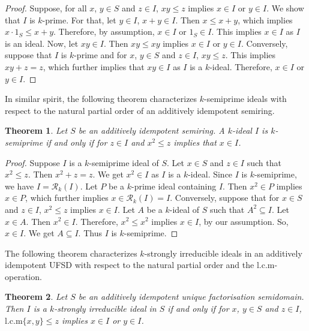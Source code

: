 \documentclass[11pt,english]{amsart}
\newtheorem{theorem}{Theorem}[section]
\theoremstyle{definition}
\numberwithin{equation}{section}
\begin{document}
\begin{proof}
    Suppose, for all $x$, $y \in S$ and $z \in I$, $xy \leqslant z$ implies $x \in I$ or $y \in I$. We show that $I$ is $k$-prime. For that, let $y \in I$, $x+y \in I$. Then $x \leqslant x+y$, which implies $x\cdot1_S \leqslant x+y$. Therefore,  by assumption, $x\in I $ or $1_S \in I $. This implies $x \in I$ as $I$ is an ideal. Now, let $xy \in I$. Then $xy \leqslant xy$ implies $x \in I$ or $y \in I$. Conversely, suppose that $I$ is $k$-prime and for $x$, $y \in S$ and $z \in I$, $xy \leqslant z$. This implies $xy + z = z$, which further implies that $xy \in I$ as $I$ is a $k$-ideal. Therefore, $x \in I$ or $y \in I$.
\end{proof}

In similar spirit, the following theorem characterizes $k$-semiprime ideals with respect to the natural partial order of an additively idempotent semiring. 

\begin{theorem}\label{k-semiprime via natural partial order}
    Let $S$ be an additively idempotent semiring. A $k$-ideal $I$ is $k$-semiprime if and only if for $z \in I$ and $x^2 \leqslant z$ implies that $ x \in I$.
\end{theorem}

 \begin{proof}
     Suppose $I$ is a $k$-semiprime ideal of $S$. Let $x \in S$ and $z \in I$ such that $x^2 \leqslant z$. Then $x^2 + z = z$. We get $x^2 \in I$ as $I$ is a $k$-ideal. Since $I$ is $k$-semiprime, we have $I=\mathcal{R}_k(I)$. Let $P$ be a $k$-prime ideal containing $I$. Then $x^2 \in P$ implies $x \in P$, which further implies $x \in \mathcal{R}_k(I) = I$. Conversely, suppose that for $x \in S$ and $z \in I$, $x^2 \leqslant z$ implies $x \in I$. Let $A$ be a $k$-ideal of $S$ such that $A^2 \subseteq I$. Let $x \in A$. Then $x^2 \in I$. Therefore, $x^2 \leqslant x^2$ implies $x \in I$, by our assumption. So, $x \in I$. We get $A \subseteq I$. Thus $I$ is $k$-semiprime.
 \end{proof}
 
The  following theorem characterizes $k$-strongly irreducible ideals in an additively idempotent UFSD with respect to the natural partial order and the $\mathrm{l.c.m}$-operation. 
 
\begin{theorem}\label{k-strongly via order and lcm}
Let $S$ be an additively idempotent unique factorisation semidomain. Then $I$ is a $k$-strongly irreducible ideal in $S$ if and only if for $x$, $y \in S$ and $z \in I$, $\mathrm{l.c.m}\{x,y\} \leqslant z$ implies $x \in I$ or $y \in I$.
\end{theorem}
\end{document}

